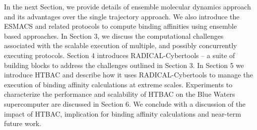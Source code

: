 
In the next Section, we provide details of ensemble molecular dynamics
approach and its advantages over the single trajectory
approach. 
We also introduce the ESMACS and related protocols to compute
binding affinities using ensemble based approaches. 
In Section 3, we discuss
the computational challenges associated with the scalable execution of
multiple, and possibly concurrently executing protocols. 
Section 4 introduces
RADICAL-Cybertools -- a suite of building blocks to address the challenges
outlined in Section 3. 
In Section 5 we introduce HTBAC and describe how it
uses RADICAL-Cybertools to manage the execution of binding affinity calculations
at extreme scales. 
Experiments to characterize the performance and scalability
of HTBAC on the Blue Waters supercomputer are discussed in Section 6. 
We
conclude with a discussion of the impact of HTBAC, implication for binding
affinity calculations and near-term future work.
